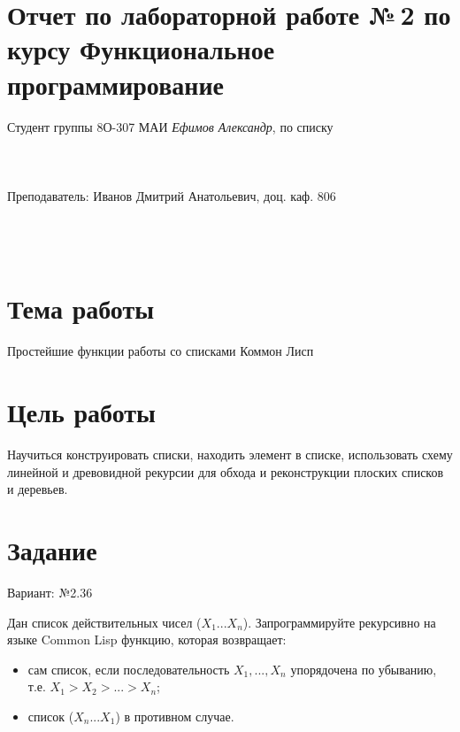 \documentclass[12pt]{article}
\begin{document}
\section*{Отчет по лабораторной работе №\,2 
по курсу \guillemotleft  Функциональное программирование\guillemotright}
\begin{flushright}
Студент группы 8О-307 МАИ \textit{Ефимов Александр},  по списку \\
 \\
 \\
\ \\
Преподаватель: Иванов Дмитрий Анатольевич, доц. каф. 806 \\
 \\
 \\
 \\

\end{flushright}

\section{Тема работы}
Простейшие функции работы со списками Коммон Лисп

\section{Цель работы}
Научиться конструировать списки, находить элемент в списке, использовать схему линейной и 
древовидной рекурсии для обхода и реконструкции плоских списков и деревьев.

\section{Задание}

Вариант: №2.36

Дан список действительных чисел ($X_1 ... X_n$).
Запрограммируйте рекурсивно на языке Common Lisp функцию, которая возвращает:

\begin{itemize}
    \item  сам список, если последовательность $X_1, ..., X_n$ упорядочена по убыванию,
    т.е. $X_1 > X_2 > ... > X_n$;
    \item  список ($X_n ... X_1$) в противном случае.
\end{itemize}
\end{document}
